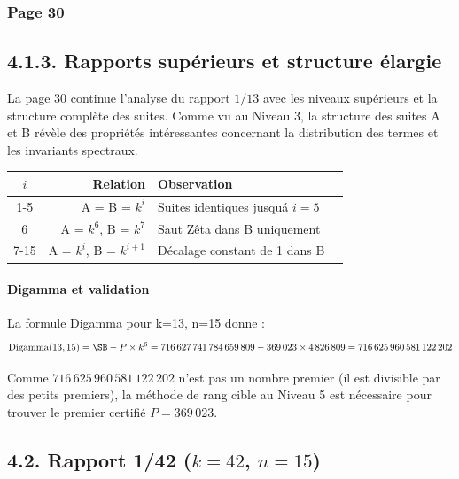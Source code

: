 \vspace{0.5cm}

\subsubsection*{Page 30}

\subsection*{4.1.3. Rapports supérieurs et structure élargie}

La page 30 continue l'analyse du rapport $1/13$ avec les niveaux supérieurs et la structure complète des suites. Comme vu au Niveau 3, la structure des suites A et B révèle des propriétés intéressantes concernant la distribution des termes et les invariants spectraux.

\begin{center}
\small
\begin{tabular}{@{}c r l l@{}}
\toprule
\rowcolor{spectralgris}
\boldmath$i$ & \textbf{Relation} & \textbf{Observation} \\
\midrule
1-5  & A = B = $k^{i}$ & Suites identiques jusqu\'a $i=5$ \\
6    & A = $k^{6}$, B = $k^{7}$ & Saut Zêta dans B uniquement \\
7-15 & A = $k^{i}$, B = $k^{i+1}$ & Décalage constant de 1 dans B \\
\bottomrule
\end{tabular}
\end{center}

\vspace{0.3cm}

\paragraph{Digamma et validation}

La formule Digamma pour k=13, n=15 donne :
$$\text{Digamma}(13,15) = \SB - P \times k^{6} = 716\,627\,741\,784\,659\,809 - 369\,023 \times 4\,826\,809 = 716\,625\,960\,581\,122\,202$$

Comme $716\,625\,960\,581\,122\,202$ n'est pas un nombre premier (il est divisible par des petits premiers), la méthode de rang cible au Niveau 5 est nécessaire pour trouver le premier certifié $P = 369\,023$.

\vspace{0.5cm}

\subsection*{4.2. Rapport 1/42 ($k = 42$, $n = 15$)}

